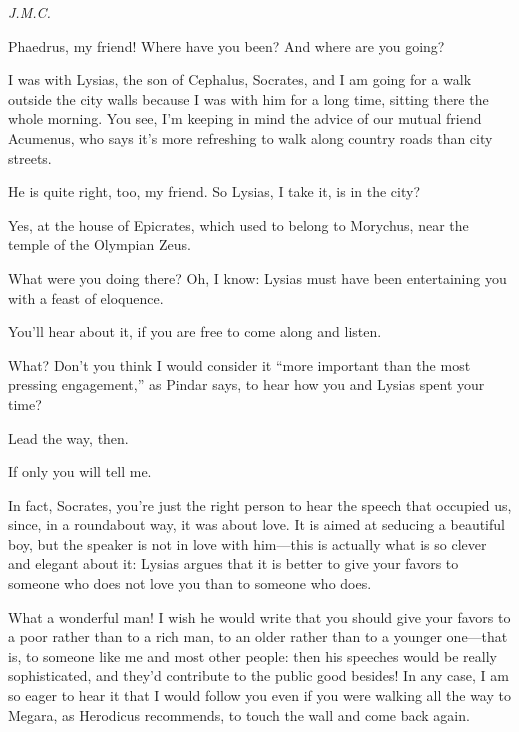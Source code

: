 {\em J.M.C.}\par
\blank[line]

\saysocrates Phaedrus, my friend! Where have you been? And where are you 
going?

\sayphaedrus I was with Lysias, the son of Cephalus, Socrates, and I am going for a walk outside the city walls because I was with him for a long time, sitting there the whole morning. You see, I'm keeping in
mind the advice of our mutual friend Acumenus, who says it's more refreshing to walk along country roads than city streets.

\saysocrates He is quite right, too, my friend. So Lysias, I take it, is in
the city?

\sayphaedrus Yes, at the house of Epicrates, which used to belong to
Morychus, 
near the temple of the Olympian Zeus.

\saysocrates What were you doing there? Oh, I know: Lysias must have been
entertaining you with a feast of eloquence.

\sayphaedrus You'll hear about it, if you are free to come along and
listen.

\saysocrates What? Don't you think I would consider it “more important than
the most pressing engagement,” as Pindar says, to hear how you and
Lysias spent your time?

\sayphaedrus Lead the way, then.

\saysocrates If only you will tell me.

\sayphaedrus In fact, Socrates, you're just the right person to hear the
speech that occupied us, since, in a roundabout way, it was about love.
It is aimed at seducing a beautiful boy, but the speaker is not in love
with him---this is actually what is so clever and elegant about it:
Lysias argues that it is better to give your favors to someone who does
not love you than to someone who does.

\saysocrates What a wonderful man! I wish he would write that you should 
give your favors to a poor rather than to a rich man, to an
older rather than to a younger one---that is, to someone like me and
most other people: then his speeches would be really sophisticated, and
they'd contribute to the public good besides! In any case, I am so eager
to hear it that I would follow you even if you were walking all the way
to Megara, as Herodicus recommends, to touch the wall and come back
again.

